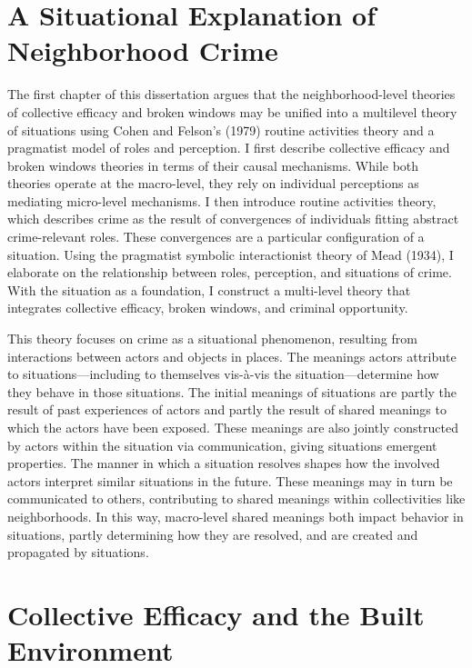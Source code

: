 \documentclass [11pt, proquest] {uwthesis}[2015/03/03]
\begin{document}
\hypertarget{a-situational-explanation-of-neighborhood-crime}{%
\section{A Situational Explanation of Neighborhood Crime}\label{a-situational-explanation-of-neighborhood-crime}}

The first chapter of this dissertation argues that the neighborhood-level theories of collective efficacy and broken windows may be unified into a multilevel theory of situations using Cohen and Felson's (1979) routine activities theory and a pragmatist model of roles and perception. I first describe collective efficacy and broken windows theories in terms of their causal mechanisms. While both theories operate at the macro-level, they rely on individual perceptions as mediating micro-level mechanisms. I then introduce routine activities theory, which describes crime as the result of convergences of individuals fitting abstract crime-relevant roles. These convergences are a particular configuration of a situation. Using the pragmatist symbolic interactionist theory of Mead (1934), I elaborate on the relationship between roles, perception, and situations of crime. With the situation as a foundation, I construct a multi-level theory that integrates collective efficacy, broken windows, and criminal opportunity.

This theory focuses on crime as a situational phenomenon, resulting from interactions between actors and objects in places. The meanings actors attribute to situations---including to themselves vis-à-vis the situation---determine how they behave in those situations. The initial meanings of situations are partly the result of past experiences of actors and partly the result of shared meanings to which the actors have been exposed. These meanings are also jointly constructed by actors within the situation via communication, giving situations emergent properties. The manner in which a situation resolves shapes how the involved actors interpret similar situations in the future. These meanings may in turn be communicated to others, contributing to shared meanings within collectivities like neighborhoods. In this way, macro-level shared meanings both impact behavior in situations, partly determining how they are resolved, and are created and propagated by situations.

\hypertarget{collective-efficacy-and-the-built-environment}{%
\section{Collective Efficacy and the Built Environment}\label{collective-efficacy-and-the-built-environment}}
\end{document}
